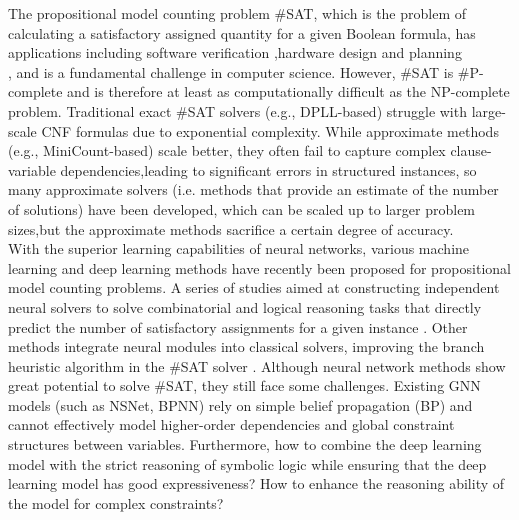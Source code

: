 The propositional model counting problem \#SAT, which is the problem of calculating a satisfactory 
assigned quantity for a given Boolean formula, has applications including software verification
\cite{DBLP:journals/fmsd/ClarkeBRZ01}\cite{DBLP:journals/tcs/IvancicYGGA08},hardware design and 
planning\cite{DBLP:conf/dac/SilvaS00}\cite{DBLP:conf/fmcad/SheeranSS00}\\ \cite{DBLP:conf/aips/DomshlakH06}, 
and is a fundamental challenge in computer science. However, \#SAT is \#P-complete and is therefore 
at least as computationally difficult as the NP-complete problem. Traditional exact \#SAT solvers 
(e.g., DPLL-based)\cite{DBLP:journals/tfs/Guller18}\cite{DBLP:journals/jacm/NieuwenhuisOT06} struggle 
with large-scale CNF formulas due to exponential complexity. While approximate methods 
(e.g., MiniCount-based)\cite{DBLP:journals/anor/KrocSS11} scale better, they often fail to capture 
complex clause-variable dependencies,leading to significant errors in structured instances, so many 
approximate solvers (i.e. methods that provide an estimate of the number of solutions) have been 
developed, which can be scaled up to larger problem sizes,but the approximate methods sacrifice a 
certain degree of accuracy.\\

With the superior learning capabilities of neural networks, various machine learning and deep learning 
methods have recently been proposed for propositional model counting problems\cite{DBLP:conf/aaai/VaezipoorLWMGSB21}\cite{Atkari_2019_10}\cite{DBLP:conf/ijcnn/OzolinsFDGZK22}. 
A series of studies aimed at constructing independent neural solvers to solve combinatorial and logical 
reasoning tasks that directly predict the number of satisfactory assignments for a given instance
\cite{DBLP:conf/iclr/AmizadehMW19}\cite{DBLP:journals/corr/abs-1903-01969}. Other methods integrate neural 
modules into classical solvers, improving the branch heuristic algorithm in the \#SAT solver
\cite{DBLP:conf/aaai/VaezipoorLWMGSB21}. Although neural network methods show great potential 
to solve \#SAT, they still face some challenges. Existing GNN models (such as NSNet\cite{DBLP:conf/nips/LiS22}, 
BPNN\cite{DBLP:conf/nips/KuckCTLSSE20}) rely on simple belief propagation (BP) and cannot effectively 
model higher-order dependencies and global constraint structures between variables. Furthermore, how 
to combine the deep learning model with the strict reasoning of symbolic logic while ensuring that the 
deep learning model has good expressiveness?\cite{DBLP:journals/tkde/WuLL24} How to enhance the reasoning 
ability of the model for complex constraints?\cite{DBLP:journals/pami/ChenJYZ22}\\

